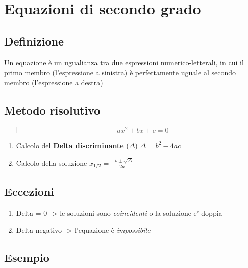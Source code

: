 \documentclass[
]{article}
\author{}
\date{}
\providecommand{\tightlist}{%
  \setlength{\itemsep}{0pt}\setlength{\parskip}{0pt}}
\begin{document}
{
\setcounter{tocdepth}{3}
\tableofcontents
}
\hypertarget{equazioni-di-secondo-grado}{%
\section{Equazioni di secondo grado}\label{equazioni-di-secondo-grado}}

\hypertarget{definizione}{%
\subsection{Definizione}\label{definizione}}

Un equazione è un ugualianza tra due espressioni numerico-letterali, in
cui il primo membro (l'espressione a sinistra) è perfettamente uguale al
secondo membro (l'espressione a destra)

\hypertarget{metodo-risolutivo}{%
\subsection{Metodo risolutivo}\label{metodo-risolutivo}}

\begin{quote}
\[ax^2+bx+c=0 \]
\end{quote}

\begin{enumerate}
\def\labelenumi{\arabic{enumi}.}
\item
  Calcolo del \textbf{Delta discriminante} (\(\Delta\))
  \(\Delta = b^2-4ac\)
\item
  Calcolo della soluzione \(x_{1/2} = \frac{-b\pm\sqrt{\Delta}}{2a}\)
\end{enumerate}

\hypertarget{eccezioni}{%
\subsection{Eccezioni}\label{eccezioni}}

\begin{enumerate}
\def\labelenumi{\arabic{enumi}.}
\tightlist
\item
  Delta = 0 -\textgreater{} le soluzioni sono \emph{coincidenti} o la
  soluzione e' doppia
\item
  Delta negativo -\textgreater{} l'equazione è \emph{impossibile}
\end{enumerate}

\hypertarget{esempio}{%
\subsection{Esempio}\label{esempio}}
\end{document}
